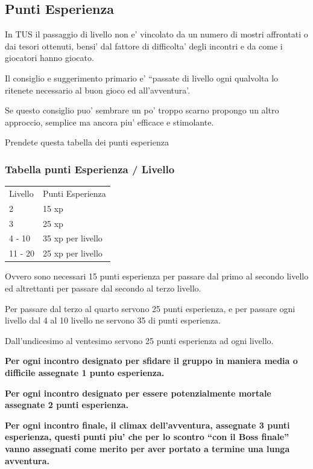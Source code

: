 \documentclass[a4paper,11pt,twoside,openany]{dndbook}
\begin{document}
{\subsection{Punti Esperienza}

\label{punti-esperienza}

In TUS il passaggio di livello non e' vincolato da un numero di mostri affrontati o dai tesori ottenuti, bensi' dal fattore di difficolta' degli incontri e da come i giocatori hanno giocato.

Il consiglio e suggerimento primario e' ``passate di livello ogni qualvolta lo ritenete necessario al buon gioco ed all'avventura'.

Se questo consiglio puo' sembrare un po' troppo scarno propongo un altro approccio, semplice ma ancora piu' efficace e stimolante.

Prendete questa tabella dei punti esperienza

\subsubsection{Tabella punti Esperienza / Livello}

\label{tabella-punti-esperienza-livello}

\begin{tabular}[c]{@{}ll@{}}
\toprule 
Livello & Punti Esperienza\tabularnewline
2 & 15 xp\tabularnewline
3 & 25 xp\tabularnewline
4 - 10 & 35 xp per livello\tabularnewline
11 - 20 & 25 xp per livello\tabularnewline
\bottomrule
\end{tabular}

\bigskip

Ovvero sono necessari 15 punti esperienza per passare dal primo al secondo livello ed altrettanti per passare dal secondo al terzo livello.

Per passare dal terzo al quarto servono 25 punti esperienza, e per passare ogni livello dal 4 al 10 livello ne servono 35 di punti esperienza.

Dall'undicesimo al ventesimo servono 25 punti esperienza ad ogni livello.

\textbf{Per ogni incontro designato per sfidare il gruppo in maniera media o difficile assegnate 1 punto esperienza.}

\textbf{Per ogni incontro designato per essere potenzialmente mortale assegnate 2 punti esperienza.}

\textbf{Per ogni incontro finale, il climax dell'avventura, assegnate 3 punti esperienza, questi punti piu' che per lo scontro ``con il Boss finale'' vanno assegnati come merito per aver portato a termine una lunga avventura.}

}
\end{document}
